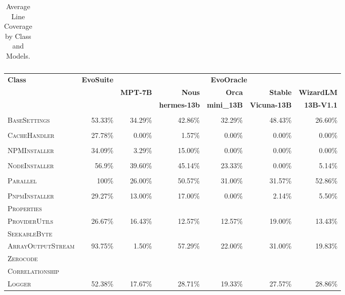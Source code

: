 \begin{table}[H]
\begin{tabular}{| l | r | r | r | r | r | r |}
\end{tabular}
\caption{Average Line Coverage by Class and Models.}
\label{tab:line_coverage}
\end{table}

\begin{table}[H]
\centering

\begin{tabular}{| l | r | r | r | r | r | r |}
\hline
\multirow{2}{*}{\textbf{Class}} & \multirow{2}{*}{\textbf{EvoSuite}} & \multicolumn{5}{c|}{\textbf{EvoOracle}} \\ %
\cline{3-7} %
 &  & \textbf{MPT-7B} & \textbf{Nous} & \textbf{Orca} & \textbf{Stable} & \textbf{WizardLM} \\
 &  &  & \textbf{hermes-13b} & \textbf{mini\_13B} & \textbf{Vicuna-13B} & \textbf{13B-V1.1} \\
\hline
\scriptsize\textsc{} &  &  &  &  &  &  \\
\scriptsize\textsc{BaseSettings} & 53.33\% & 34.29\% & 42.86\% & 32.29\% & 48.43\% & 26.60\% \\
\hline
\scriptsize\textsc{} &  &  &  &  &  &  \\
\scriptsize\textsc{CacheHandler} & 27.78\% & 0.00\% & 1.57\% & 0.00\% & 0.00\% & 0.00\% \\
\hline
\scriptsize\textsc{} &  &  &  &  &  &  \\
\scriptsize\textsc{NPMInstaller} & 34.09\% & 3.29\% & 15.00\% & 0.00\% & 0.00\% & 0.00\% \\
\hline
\scriptsize\textsc{} &  &  &  &  &  &  \\
\scriptsize\textsc{NodeInstaller} & 56.9\% & 39.60\% & 45.14\% & 23.33\% & 0.00\% & 5.14\% \\
\hline
\scriptsize\textsc{} &  &  &  &  &  &  \\
\scriptsize\textsc{Parallel} & 100\% & 26.00\% & 50.57\% & 31.00\% & 31.57\% & 52.86\% \\
\hline
\scriptsize\textsc{} &  &  &  &  &  &  \\
\scriptsize\textsc{PnpmInstaller} & 29.27\% & 13.00\% & 17.00\% & 0.00\% & 2.14\% & 5.50\% \\
\hline
\scriptsize\textsc{Properties} &  &  &  &  &  &  \\
\scriptsize\textsc{ProviderUtils} & 26.67\% & 16.43\% & 12.57\% & 12.57\% & 19.00\% & 13.43\% \\
\hline
\scriptsize\textsc{SeekableByte} &  &  &  &  &  &  \\
\scriptsize\textsc{ArrayOutputStream} & 93.75\% & 1.50\% & 57.29\% & 22.00\% & 31.00\% & 19.83\% \\
\hline
\scriptsize\textsc{Zerocode} &  &  &  &  &  &  \\
\scriptsize\textsc{Correlationship} &  &  &  &  &  &  \\
\scriptsize\textsc{Logger} & 52.38\% & 17.67\% & 28.71\% & 19.33\% & 27.57\% & 28.86\% \\
\hline


\end{tabular}
\end{table}

